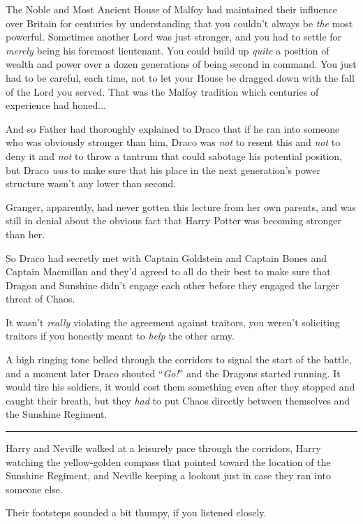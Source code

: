 The Noble and Most Ancient House of Malfoy had maintained their influence over Britain for centuries by understanding that you couldn't always be \emph{the} most powerful. Sometimes another Lord was just stronger, and you had to settle for \emph{merely} being his foremost lieutenant. You could build up \emph{quite} a position of wealth and power over a dozen generations of being second in command. You just had to be careful, each time, not to let your House be dragged down with the fall of the Lord you served. That was the Malfoy tradition which centuries of experience had honed...

And so Father had thoroughly explained to Draco that if he ran into someone who was obviously stronger than him, Draco was \emph{not} to resent this and \emph{not} to deny it and \emph{not} to throw a tantrum that could sabotage his potential position, but Draco \emph{was} to make sure that his place in the next generation's power structure wasn't any lower than second.

Granger, apparently, had never gotten this lecture from her own parents, and was still in denial about the obvious fact that Harry Potter was becoming stronger than her.

So Draco had secretly met with Captain Goldstein and Captain Bones and Captain Macmillan and they'd agreed to all do their best to make sure that Dragon and Sunshine didn't engage each other before they engaged the larger threat of Chaos.

It wasn't \emph{really} violating the agreement against traitors, you weren't soliciting traitors if you honestly meant to \emph{help} the other army.

A high ringing tone belled through the corridors to signal the start of the battle, and a moment later Draco shouted ``\emph{Go!}'' and the Dragons started running. It would tire his soldiers, it would cost them something even after they stopped and caught their breath, but they \emph{had} to put Chaos directly between themselves and the Sunshine Regiment.

\begin{center}\rule{3in}{0.4pt}\end{center}

Harry and Neville walked at a leisurely pace through the corridors, Harry watching the yellow-golden compass that pointed toward the location of the Sunshine Regiment, and Neville keeping a lookout just in case they ran into someone else.

Their footsteps sounded a bit thumpy, if you listened closely.

